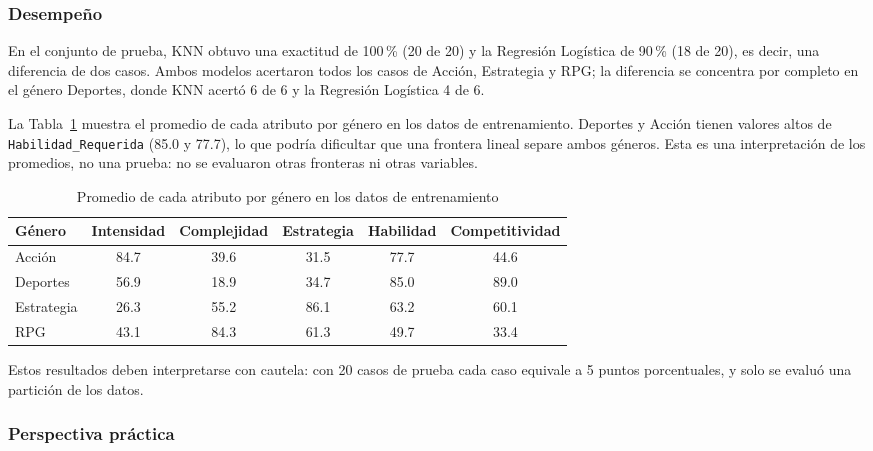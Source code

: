 \documentclass[]{article}
\begin{document}
\subsubsection{Desempeño}

En el conjunto de prueba, KNN obtuvo una exactitud de 100\,\% (20 de 20) y la Regresión Logística de 90\,\% (18 de 20), es decir, una diferencia de dos casos. Ambos modelos acertaron todos los casos de Acción, Estrategia y RPG; la diferencia se concentra por completo en el género Deportes, donde KNN acertó 6 de 6 y la Regresión Logística 4 de 6.

La Tabla~\ref{tab:medias2} muestra el promedio de cada atributo por género en los datos de entrenamiento. Deportes y Acción tienen valores altos de \texttt{Habilidad\_Requerida} (85.0 y 77.7), lo que podría dificultar que una frontera lineal separe ambos géneros. Esta es una interpretación de los promedios, no una prueba: no se evaluaron otras fronteras ni otras variables.

\begin{table}[H]
\centering
\small
\caption{Promedio de cada atributo por género en los datos de entrenamiento}
\label{tab:medias2}
\begin{tabular}{l c c c c c}
\toprule
\textbf{Género} & \textbf{Intensidad} & \textbf{Complejidad} & \textbf{Estrategia} & \textbf{Habilidad} & \textbf{Competitividad} \\
\midrule
Acción     & 84.7 & 39.6 & 31.5 & 77.7 & 44.6 \\
Deportes   & 56.9 & 18.9 & 34.7 & 85.0 & 89.0 \\
Estrategia & 26.3 & 55.2 & 86.1 & 63.2 & 60.1 \\
RPG        & 43.1 & 84.3 & 61.3 & 49.7 & 33.4 \\
\bottomrule
\end{tabular}
\end{table}

Estos resultados deben interpretarse con cautela: con 20 casos de prueba cada caso equivale a 5 puntos porcentuales, y solo se evaluó una partición de los datos.

\subsubsection{Perspectiva práctica}
\end{document}
